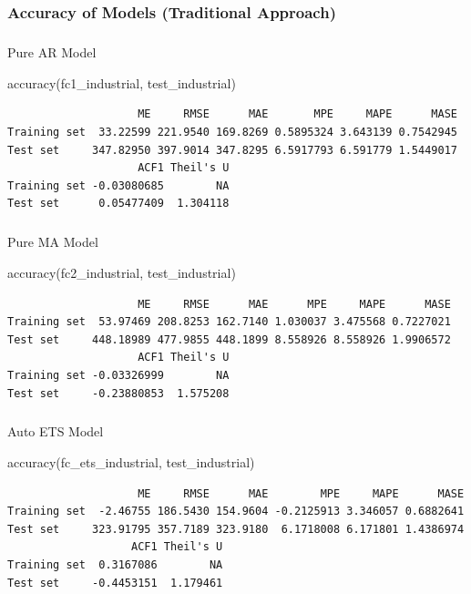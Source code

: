 \documentclass[
  letterpaper,
  DIV=11,
  numbers=noendperiod]{scrartcl}
\makeatletter
\let\oldsubparagraph\subparagraph
\renewcommand{\subparagraph}{
    \@ifstar
      \xxxSubParagraphStar
      \xxxSubParagraphNoStar
  }
\newcommand{\xxxSubParagraphStar}[1]{\oldsubparagraph*{#1}\mbox{}}
\newcommand{\xxxSubParagraphNoStar}[1]{\oldsubparagraph{#1}\mbox{}}
\newenvironment{Shaded}{\begin{snugshade}}{\end{snugshade}}
\newcommand{\FunctionTok}[1]{\textcolor[rgb]{0.28,0.35,0.67}{#1}}
\newcommand{\NormalTok}[1]{\textcolor[rgb]{0.00,0.23,0.31}{#1}}
\makeatother
\begin{document}
\subsubsection{Accuracy of Models (Traditional
Approach)}\label{accuracy-of-models-traditional-approach}

\subparagraph{Pure AR Model}\label{pure-ar-model-1}

\begin{Shaded}
\begin{Highlighting}[]
\FunctionTok{accuracy}\NormalTok{(fc1\_industrial, test\_industrial)}
\end{Highlighting}
\end{Shaded}

\begin{verbatim}
                    ME     RMSE      MAE       MPE     MAPE      MASE
Training set  33.22599 221.9540 169.8269 0.5895324 3.643139 0.7542945
Test set     347.82950 397.9014 347.8295 6.5917793 6.591779 1.5449017
                    ACF1 Theil's U
Training set -0.03080685        NA
Test set      0.05477409  1.304118
\end{verbatim}

\subparagraph{Pure MA Model}\label{pure-ma-model-1}

\begin{Shaded}
\begin{Highlighting}[]
\FunctionTok{accuracy}\NormalTok{(fc2\_industrial, test\_industrial)}
\end{Highlighting}
\end{Shaded}

\begin{verbatim}
                    ME     RMSE      MAE      MPE     MAPE      MASE
Training set  53.97469 208.8253 162.7140 1.030037 3.475568 0.7227021
Test set     448.18989 477.9855 448.1899 8.558926 8.558926 1.9906572
                    ACF1 Theil's U
Training set -0.03326999        NA
Test set     -0.23880853  1.575208
\end{verbatim}

\subparagraph{Auto ETS Model}\label{auto-ets-model-1}

\begin{Shaded}
\begin{Highlighting}[]
\FunctionTok{accuracy}\NormalTok{(fc\_ets\_industrial, test\_industrial)}
\end{Highlighting}
\end{Shaded}

\begin{verbatim}
                    ME     RMSE      MAE        MPE     MAPE      MASE
Training set  -2.46755 186.5430 154.9604 -0.2125913 3.346057 0.6882641
Test set     323.91795 357.7189 323.9180  6.1718008 6.171801 1.4386974
                   ACF1 Theil's U
Training set  0.3167086        NA
Test set     -0.4453151  1.179461
\end{verbatim}
\end{document}

